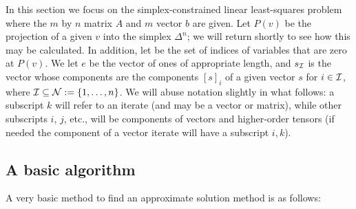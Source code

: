 \documentclass[12pt,twoside]{article}
\renewcommand{\half}{\frac{1}{2}}
\begin{document}
In this section we focus on the simplex-constrained linear least-squares
problem
\eqn{slls}{\minimizeover{x \in \Delta^n}
 f(x) \define \half \| A x - b \|^2,}
where the $m$ by $n$ matrix $A$ and $m$ vector $b$ are given.
Let $P(v)$ be the projection of a given $v$ into the simplex $\Delta^n$;
we will return shortly to see how this may be calculated. In addition, let
be the set of indices of variables that are zero at $P(v)$. We let
$e$ be the vector of ones of appropriate length, and $s_{{\cal I}}$ is the
vector whose components
are the components $[s]_i$ of a given vector $s$ for $i \in {\cal I}$,
where ${\cal I} \subseteq {\cal N} := \{1,\ldots,n\}$.
We will abuse notation slightly in what follows: a subscript $k$ will
refer to an iterate (and may be a vector or matrix), while other
subscripts $i$, $j$,
etc., will be components of vectors and higher-order tensors (if needed
the component of a vector iterate will have a subscript $i,k$).

\newpage

\subsection{A basic algorithm}

A very basic method to find an approximate solution method is as follows:
\end{document}
